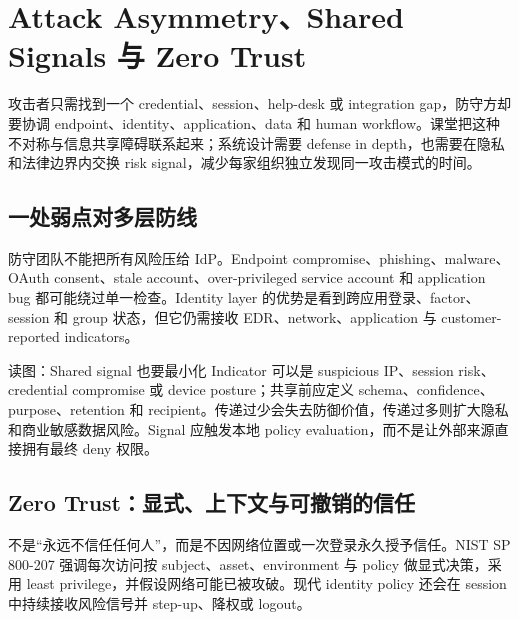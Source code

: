 \section{Attack Asymmetry、Shared Signals 与 Zero Trust}

攻击者只需找到一个 credential、session、help-desk 或 integration gap，防守方却要协调 endpoint、identity、application、data 和 human workflow。课堂把这种不对称与信息共享障碍联系起来；系统设计需要 defense in depth，也需要在隐私和法律边界内交换 risk signal，减少每家组织独立发现同一攻击模式的时间。

\subsection{一处弱点对多层防线}

防守团队不能把所有风险压给 IdP。Endpoint compromise、phishing、malware、OAuth consent、stale account、over-privileged service account 和 application bug 都可能绕过单一检查。Identity layer 的优势是看到跨应用登录、factor、session 和 group 状态，但它仍需接收 EDR、network、application 与 customer-reported indicators。


\begin{knowledgebox}{读图：Shared signal 也要最小化}
Indicator 可以是 suspicious IP、session risk、credential compromise 或 device posture；共享前应定义 schema、confidence、purpose、retention 和 recipient。传递过少会失去防御价值，传递过多则扩大隐私和商业敏感数据风险。Signal 应触发本地 policy evaluation，而不是让外部来源直接拥有最终 deny 权限。
\end{knowledgebox}

\subsection{Zero Trust：显式、上下文与可撤销的信任}

 不是“永远不信任任何人”，而是不因网络位置或一次登录永久授予信任。NIST SP 800-207 强调每次访问按 subject、asset、environment 与 policy 做显式决策，采用 least privilege，并假设网络可能已被攻破。现代 identity policy 还会在 session 中持续接收风险信号并 step-up、降权或 logout。



